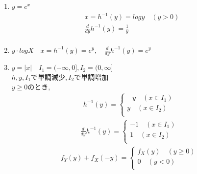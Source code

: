 \documentclass[dvipdfmx,10pt, a4j]{jarticle}
\theoremstyle{definition}
\begin{document}
    \begin{enumerate}[(1)]
        \item $y = e^{x}$\\
        \begin{align*}
            &x = h^{-1}(y) = logy \quad (y > 0)\\
            &\frac{d}{dy}h^{-1}(y) = \frac{1}{y}\\
        \end{align*}
        \item $y \cdot logX \quad x = h^{-1}(y) = e^{y}, \quad \frac{d}{dy}h^{-1}(y) = e^{y}$\\
        \item $y = |x| \quad I_1 = (- \infty, 0], I_2 = (0, \infty]$\\
        $h, y, I_1で単調減少,I_2で単調増加$\\
        $y \geq 0 のとき,$\\
        \begin{align*}
            h^{-1}(y) =
            \begin{cases}
                -y \quad (x \in I_1)\\
                y \quad (x \in I_2)\\
            \end{cases}
        \end{align*}
        \begin{align*}
            \frac{d}{dy}h^{-1}(y) =
            \begin{cases}
                -1 \quad (x \in I_1)\\
                1 \quad (x \in I_2)\\
            \end{cases}
        \end{align*}
        \begin{align*}
            f_Y(y) + f_X(-y) =
            \begin{cases}
                f_X(y) \quad (y \geq 0)\\
                0 \quad (y < 0)\\
            \end{cases}
        \end{align*}
    \end{enumerate}
\end{document}
